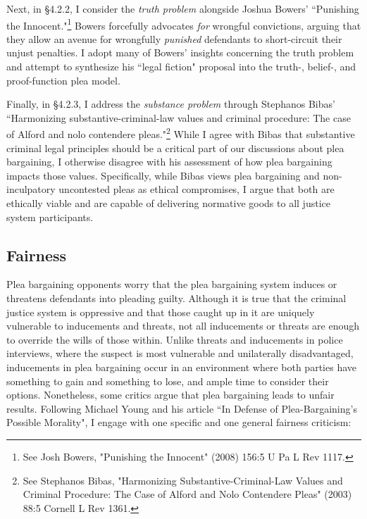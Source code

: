 Next, in \S 4.2.2, I consider the \textit{truth problem} alongside Joshua Bowers' ``Punishing the Innocent."\footnote{See Josh Bowers, "Punishing the Innocent" (2008) 156:5 U Pa L Rev 1117.} Bowers forcefully advocates \textit{for} wrongful convictions, arguing that they allow an avenue for wrongfully \textit{punished} defendants to short-circuit their unjust penalties. I adopt many of Bowers' insights concerning the truth problem and attempt to synthesize his ``legal fiction" proposal into the truth-, belief-, and proof-function plea model. 

Finally, in \S 4.2.3, I address the \textit{substance problem} through Stephanos Bibas' ``Harmonizing substantive-criminal-law values and criminal procedure: The case of Alford and nolo contendere pleas."\footnote{See Stephanos Bibas, "Harmonizing Substantive-Criminal-Law Values and Criminal Procedure:
The Case of Alford and Nolo Contendere Pleas" (2003) 88:5 Cornell L Rev 1361.} While I agree with Bibas that substantive criminal legal principles should be a critical part of our discussions about plea bargaining, I otherwise disagree with his assessment of how plea bargaining impacts those values. Specifically, while Bibas views plea bargaining and non-inculpatory uncontested pleas as ethical compromises, I argue that both are ethically viable and are capable of delivering normative goods to all justice system participants.

\subsection{Fairness}

Plea bargaining opponents worry that the plea bargaining system induces or threatens defendants into pleading guilty. Although it is true that the criminal justice system is oppressive and that those caught up in it are uniquely vulnerable to inducements and threats, not all inducements or threats are enough to override the wills of those within. Unlike threats and inducements in police interviews, where the suspect is most vulnerable and unilaterally disadvantaged, inducements in plea bargaining occur in an environment where both parties have something to gain and something to lose, and ample time to consider their options. Nonetheless, some critics argue that plea bargaining leads to unfair results. Following Michael Young and his article ``In Defense of Plea-Bargaining's Possible Morality", I engage with one specific and one general fairness criticism:

